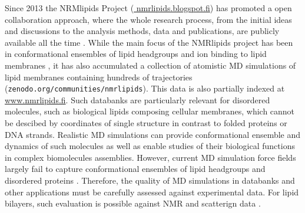 \documentclass[journal=jpcbfk,manuscript=article,layout=twocolumn]{achemso}
\begin{document}
Since 2013 the NRMlipids Project (\url{ nmrlipids.blogspot.fi}) has
promoted a open collaboration approach,
where the whole research process, from the initial ideas and discussions to
the analysis methods, data and publications, are publicly available all the time \cite{botan15}.
While the main focus of the NMRlipids project has been in conformational ensembles
of lipid headgroups and ion binding to lipid membranes \cite{botan15,catte16,antila19},
it has also accumulated a collection 
of atomistic MD simulations of lipid membranes containing hundreds of trajectories ({\tt zenodo.org/communities/nmrlipids}).
This data is also partially indexed at \url{www.nmrlipids.fi}.
Such databanks are particularly relevant for disordered molecules, such as %
biological lipids composing cellular membranes, which cannot be descibed by coordinates of single structure in contrast to
folded proteins or DNA strands.
Realistic MD simulations can provide conformational ensemble and dynamics of such molecules as well as
enable studies of their biological functions in complex biomolecules assemblies.
However, current MD simulation force fields largely fail to capture conformational ensembles of lipid headgroups and
disordered proteins \cite{botan15,antila19,??}.
Therefore, the quality of MD simulations in databanks and other applications must be carefully assessed against
experimental data.
For lipid bilayers, such evaluation is possible against NMR and scatterign data \cite{ollila16}.
\end{document}
